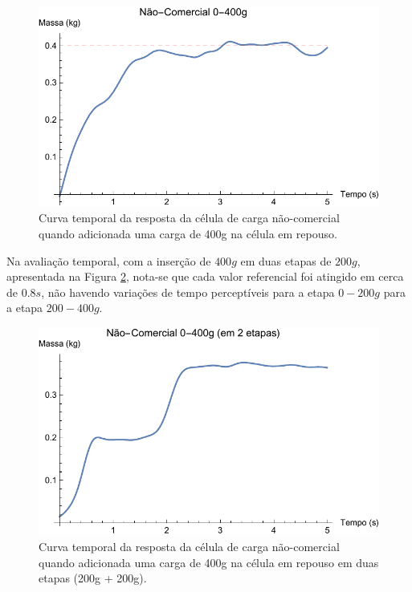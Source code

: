 \documentclass[a4paper]{instrumentacao}
\begin{document}
\begin{figure}[H]
\center
\includegraphics[width=\textwidth]{NaoComercial_0-400g.pdf}
\caption{Curva temporal da resposta da célula de carga não-comercial quando adicionada uma carga de 400g na célula em repouso.}
\label{fig:celula-nao-comercial-resultado-0-400g}
\end{figure}

Na avaliação temporal, com a inserção de $400g$ em duas etapas de $200g$, apresentada na Figura \ref{fig:celula-nao-comercial-resultado-0-400g-etapa}, nota-se que cada valor referencial foi atingido em cerca de $0.8s$, não havendo variações de tempo perceptíveis para a etapa $0-200g$ para a etapa $200-400g$.

\begin{figure}[H]
\center
\includegraphics[width=\textwidth]{NaoComercial_0-400g_etapa.pdf}
\caption{Curva temporal da resposta da célula de carga não-comercial quando adicionada uma carga de 400g na célula em repouso em duas etapas (200g + 200g).}
\label{fig:celula-nao-comercial-resultado-0-400g-etapa}
\end{figure}
\end{document}
